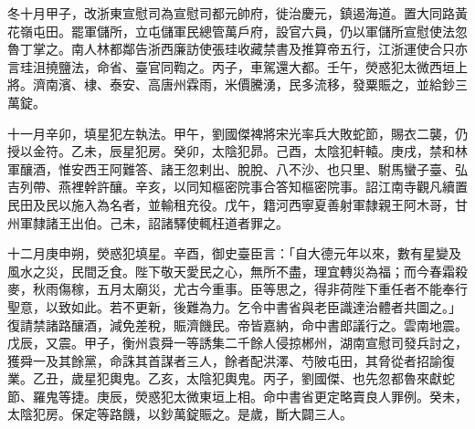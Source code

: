 \begin{pinyinscope}
 冬十月甲子，改浙東宣慰司為宣慰司都元帥府，徙治慶元，鎮遏海道。置大同路黃花嶺屯田。罷軍儲所，立屯儲軍民總管萬戶府，設官六員，仍以軍儲所宣慰使法忽魯丁掌之。南人林都鄰告浙西廉訪使張珪收藏禁書及推算帝五行，江浙運使合只亦言珪沮撓鹽法，命省、臺官同鞫之。丙子，車駕還大都。壬午，熒惑犯太微西垣上將。濟南濱、棣、泰安、高唐州霖雨，米價騰湧，民多流移，發粟賑之，並給鈔三萬錠。



 十一月辛卯，填星犯左執法。甲午，劉國傑裨將宋光率兵大敗蛇節，賜衣二襲，仍授以金符。乙未，辰星犯房。癸卯，太陰犯昴。己酉，太陰犯軒轅。庚戌，禁和林軍釀酒，惟安西王阿難答、諸王忽剌出、脫脫、八不沙、也只里、駙馬蠻子臺、弘吉列帶、燕裡幹許釀。辛亥，以同知樞密院事合答知樞密院事。詔江南寺觀凡續置民田及民以施入為名者，並輸租充役。戊午，籍河西寧夏善射軍隸親王阿木哥，甘州軍隸諸王出伯。己未，詔諸驛使輒枉道者罪之。



 十二月庚申朔，熒惑犯填星。辛酉，御史臺臣言：「自大德元年以來，數有星變及風水之災，民間乏食。陛下敬天愛民之心，無所不盡，理宜轉災為福；而今春霜殺麥，秋雨傷稼，五月太廟災，尤古今重事。臣等思之，得非荷陛下重任者不能奉行聖意，以致如此。若不更新，後難為力。乞令中書省與老臣識達治體者共圖之。」復請禁諸路釀酒，減免差稅，賑濟饑民。帝皆嘉納，命中書郎議行之。雲南地震。戊辰，又震。甲子，衡州袁舜一等誘集二千餘人侵掠郴州，湖南宣慰司發兵討之，獲舜一及其餘黨，命誅其首謀者三人，餘者配洪澤、芍陂屯田，其脅從者招諭復業。乙丑，歲星犯輿鬼。乙亥，太陰犯輿鬼。丙子，劉國傑、也先忽都魯來獻蛇節、羅鬼等捷。庚辰，熒惑犯太微東垣上相。命中書省更定略賣良人罪例。癸未，太陰犯房。保定等路饑，以鈔萬錠賑之。是歲，斷大闢三人。



\end{pinyinscope}